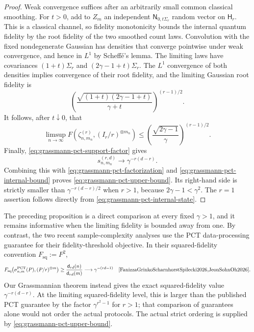 \documentclass[11pt]{article}
\theoremstyle{remark}
\theoremstyle{plain}
\newcommand{\ot}{\otimes}
\begin{document}
\begin{proof}
Weak convergence suffices after an arbitrarily small common classical
smoothing.  For \(t>0\), add to \(Z_m\) an independent
\(\mathsf N_{0,t\Sigma_r}\) random vector on \(\mathsf H_r\).  This is a
classical channel, so fidelity monotonicity bounds the internal quantum
fidelity by the root fidelity of the two smoothed count laws.  Convolution
with the fixed nondegenerate Gaussian has densities that converge pointwise
under weak convergence, and hence in \(L^1\) by Scheff\'e's lemma.  The
limiting laws have covariances \((1+t)\Sigma_r\) and
\((2\gamma-1+t)\Sigma_r\).  The \(L^1\) convergence of both densities
implies convergence of their root fidelity, and the limiting Gaussian
root fidelity is
\[
  \left(
    \frac{\sqrt{(1+t)(2\gamma-1+t)}}{\gamma+t}
  \right)^{(r-1)/2}.
\]
It follows, after \(t\downarrow0\), that
\begin{equation}
  \limsup_{n\to\infty}
  F\!\left(\zeta_{n,m_n}^{(r)},(I_r/r)^{\ot m_n}\right)
  \le
  \left(\frac{\sqrt{2\gamma-1}}{\gamma}\right)^{(r-1)/2}.
  \label{eq:grassmann-pct-internal-bound}
\end{equation}
Finally, \eqref{eq:grassmann-pct-support-factor} gives
\[
  s_{n,m_n}^{(r,d)}\longrightarrow\gamma^{-r(d-r)}.
\]
Combining this with \eqref{eq:grassmann-pct-factorization} and
\eqref{eq:grassmann-pct-internal-bound} proves
\eqref{eq:grassmann-pct-upper-bound}.  Its right-hand side is strictly
smaller than \(\gamma^{-r(d-r)/2}\) when \(r>1\), because
\(2\gamma-1<\gamma^2\).  The \(r=1\) assertion follows directly from
\eqref{eq:grassmann-pct-internal-state}.
\end{proof}

The preceding proposition is a direct comparison at every fixed
\(\gamma>1\), and it remains informative when the limiting fidelity is
bounded away from one.  By contrast, the two recent sample-complexity
analyses use the PCT data-processing guarantee for their fidelity-threshold
objective.  In their squared-fidelity convention \(F_{\mathrm{sq}}:=F^2\),
\[
  F_{\mathrm{sq}}\!\left(
    \sigma_{n,m}^{\mathrm{PCT}}(P),(P/r)^{\ot m}
  \right)
  \ge\frac{\mathsf d_{rd}(n)}{\mathsf d_{rd}(m)}
  \longrightarrow\gamma^{-(rd-1)}
  \quad\cite{FanizzaGrinkoScharnhorstSpilecki2026,JeonSohnOh2026}.
\]
Our Grassmannian theorem instead gives the exact squared-fidelity value
\(\gamma^{-r(d-r)}\).  At the limiting squared-fidelity level, this is
larger than the published PCT guarantee by the factor
\(\gamma^{r^2-1}\) for \(r>1\); that comparison of guarantees alone would
not order the actual protocols.  The actual strict ordering is supplied by
\eqref{eq:grassmann-pct-upper-bound}.
\end{document}
